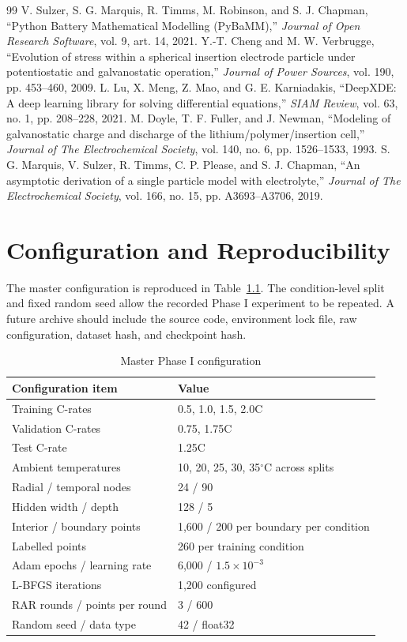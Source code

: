 \documentclass[14pt,a4paper,oneside]{extreport}
\begin{document}
\begin{thebibliography}{99}
 V. Sulzer, S. G. Marquis, R. Timms, M. Robinson, and S. J. Chapman, ``Python Battery Mathematical Modelling (PyBaMM),'' \emph{Journal of Open Research Software}, vol. 9, art. 14, 2021.
 Y.-T. Cheng and M. W. Verbrugge, ``Evolution of stress within a spherical insertion electrode particle under potentiostatic and galvanostatic operation,'' \emph{Journal of Power Sources}, vol. 190, pp. 453--460, 2009.
 L. Lu, X. Meng, Z. Mao, and G. E. Karniadakis, ``DeepXDE: A deep learning library for solving differential equations,'' \emph{SIAM Review}, vol. 63, no. 1, pp. 208--228, 2021.
 M. Doyle, T. F. Fuller, and J. Newman, ``Modeling of galvanostatic charge and discharge of the lithium/polymer/insertion cell,'' \emph{Journal of The Electrochemical Society}, vol. 140, no. 6, pp. 1526--1533, 1993.
 S. G. Marquis, V. Sulzer, R. Timms, C. P. Please, and S. J. Chapman, ``An asymptotic derivation of a single particle model with electrolyte,'' \emph{Journal of The Electrochemical Society}, vol. 166, no. 15, pp. A3693--A3706, 2019.
\end{thebibliography}

\appendix
\chapter{Configuration and Reproducibility}
The master configuration is reproduced in Table~\ref{tab:appendixconfig}. The condition-level split and fixed random seed allow the recorded Phase I experiment to be repeated. A future archive should include the source code, environment lock file, raw configuration, dataset hash, and checkpoint hash.

\begin{longtable}{p{}p{}}
\caption{Master Phase I configuration}\label{tab:appendixconfig}\\
\toprule
Configuration item & Value\\
\midrule
Training C-rates & 0.5, 1.0, 1.5, 2.0C\\
Validation C-rates & 0.75, 1.75C\\
Test C-rate & 1.25C\\
Ambient temperatures & 10, 20, 25, 30, 35$^{\circ}$C across splits\\
Radial / temporal nodes & 24 / 90\\
Hidden width / depth & 128 / 5\\
Interior / boundary points & 1,600 / 200 per boundary per condition\\
Labelled points & 260 per training condition\\
Adam epochs / learning rate & 6,000 / $1.5\times10^{-3}$\\
L-BFGS iterations & 1,200 configured\\
RAR rounds / points per round & 3 / 600\\
Random seed / data type & 42 / float32\\
\bottomrule
\end{longtable}
\end{document}
